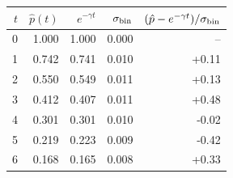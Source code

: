\begin{tabular}{rrrrr}
\toprule
$t$ & $\hat p(t)$ & $e^{-\gamma t}$ & $\sigma_{\rm bin}$ & $(\hat p-e^{-\gamma t})/\sigma_{\rm bin}$ \\
\midrule
0 & 1.000 & 1.000 & 0.000 & -- \\
1 & 0.742 & 0.741 & 0.010 & +0.11 \\
2 & 0.550 & 0.549 & 0.011 & +0.13 \\
3 & 0.412 & 0.407 & 0.011 & +0.48 \\
4 & 0.301 & 0.301 & 0.010 & -0.02 \\
5 & 0.219 & 0.223 & 0.009 & -0.42 \\
6 & 0.168 & 0.165 & 0.008 & +0.33 \\
\bottomrule
\end{tabular}
